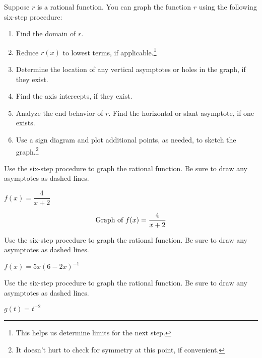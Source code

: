 \documentclass{ximera}
\begin{document}
	\author{Stitz-Zeager}


Suppose $r$ is a rational function.  You can graph the function $r$ using the following six-step procedure:

\begin{enumerate}

\item  Find the domain of $r$.

\item  Reduce $r(x)$ to lowest terms, if applicable.\footnote{This helps us determine limits for the next step.}

\item  Determine the location of any vertical asymptotes or holes in the graph, if they exist. 

\item  Find the axis intercepts, if they exist.

\item  Analyze the end behavior of $r$.  Find the horizontal or slant asymptote, if one exists.

\item  Use a sign diagram and plot additional points, as needed, to sketch the graph.\footnote{It doesn't hurt to check for symmetry at this point, if convenient.}

\end{enumerate}

\begin{problem}\label{sixstepfirst}
Use the six-step procedure
to graph the rational function.  Be sure to draw any asymptotes as dashed lines.

$f(x) = \dfrac{4}{x + 2}$

\begin{solution}
\[
\graph[xmin=-7, xmax=5, ymin=-5, ymax=5,panel]{f(x)=\frac{4}{x+2}}
\]
\end{solution}
\end{problem}

\begin{problem}
Use the six-step procedure
to graph the rational function.  Be sure to draw any asymptotes as dashed lines.

$f(x) = 5x(6-2x)^{-1}$ 
\end{problem}  

\begin{problem}
Use the six-step procedure
to graph the rational function.  Be sure to draw any asymptotes as dashed lines.

$g(t) = t^{-2}$
\end{problem} 
\end{document}
